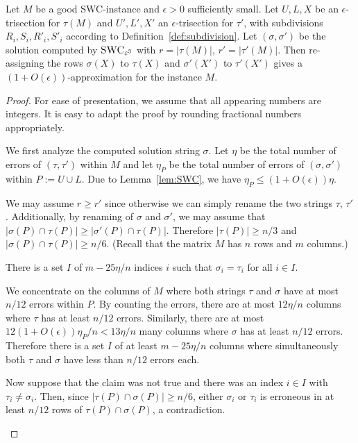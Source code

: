 \begin{lemma}
    \label{lem:swc-gap}
    Let $M$ be a good SWC-instance and $\epsilon > 0$ sufficiently small.
    Let $U,L,X$ be an $\epsilon$-trisection for $\tau(M)$ and $U',L',X'$ an $\epsilon$-trisection for $\tau'$, with subdivisions $R_i,S_i,R'_i,S'_i$ according to Definition~\ref{def:subdivision}.
    Let $(\sigma, \sigma')$ be the solution computed by $\textsc{SWC}_{\epsilon^3}$ with $r = |\tau(M)|$, $r' = |\tau'(M)|$.
    Then re-assigning the rows $\sigma(X)$ to $\tau(X)$ and $\sigma'(X')$ to $\tau'(X')$ gives a $(1 + O(\epsilon))$-approximation for the instance $M$.
\end{lemma}
\begin{proof}
    For ease of presentation, we assume that all appearing numbers are integers.
    It is easy to adapt the proof by rounding fractional numbers appropriately.

    We first analyze the computed solution string $\sigma$. 
    Let $\eta$ be the total number of errors of $(\tau,\tau')$ within $M$ and
    let $\eta_P$ be the total number of errors of $(\sigma,\sigma')$ within $P := U \cup L$.
    Due to Lemma~\ref{lem:SWC}, we have $\eta_P \le (1+O(\epsilon)) \eta$.

    We may assume $r \ge r'$ since otherwise we can simply rename the two strings $\tau$, $\tau'$.
    Additionally, by renaming of $\sigma$ and $\sigma'$, we may assume that $|\sigma(P) \cap \tau(P)| \ge |\sigma'(P) \cap \tau(P)|$.
    Therefore $|\tau(P)| \ge n/3$ and $|\sigma(P) \cap \tau(P)| \ge n/6$.
    (Recall that the matrix $M$ has $n$ rows and $m$ columns.)

    \begin{claim}\label{claim:agree}
        There is a set $I$ of $m - 25\eta/n$ indices $i$ such that
        $\sigma_i = \tau_i$ for all $i \in I$.
    \end{claim}
    \begin{subproof}
        We concentrate on the columns of $M$ where both strings $\tau$ and $\sigma$ have at most $n/12$ errors within $P$.
        By counting the errors, there are at most $12 \eta/n$ columns where $\tau$ has at least $n/12$ errors.
        Similarly, there are at most $12 (1+O(\epsilon)) \eta_P/ n < 13 \eta/ n$ many columns where $\sigma$ has at least $n/12$ errors.
        Therefore there is a set $I$ of at least $m - 25\eta/n$ columns where simultaneously both $\tau$ and $\sigma$ have less than $n/12$ errors each.

        Now suppose that the claim was not true and there was an index $i \in I$ with $\tau_i \neq \sigma_i$.
        Then, since $|\tau(P) \cap \sigma(P)| \ge n/6$, either $\sigma_i$ or $\tau_i$ is erroneous in at least $n/12$ rows of $\tau(P) \cap \sigma(P)$, a contradiction.
    \end{subproof}


\end{proof}
